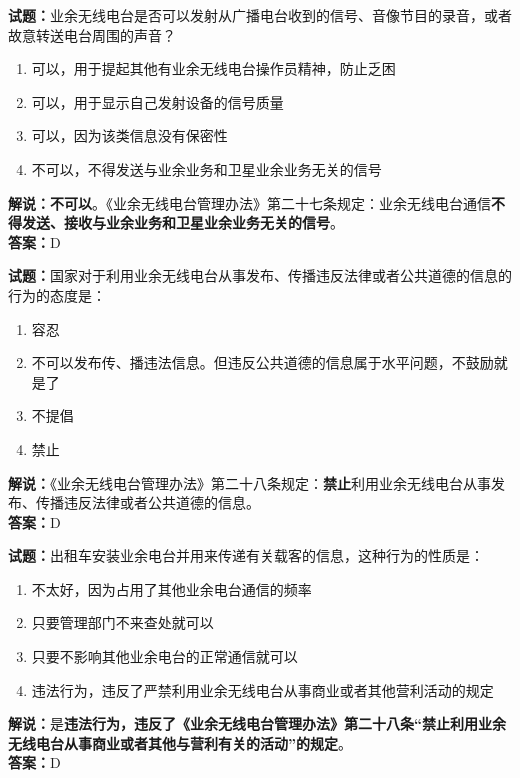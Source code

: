 \documentclass{ctexbook}
\begin{document}
\vspace{\baselineskip}

\noindent\textbf{试题：}业余无线电台是否可以发射从广播电台收到的信号、音像节目的录音，或者故意转送电台周围的声音？
\begin{enumerate}[leftmargin=3em]
  \item 可以，用于提起其他有业余无线电台操作员精神，防止乏困
  \item 可以，用于显示自己发射设备的信号质量
  \item 可以，因为该类信息没有保密性
  \item 不可以，不得发送与业余业务和卫星业余业务无关的信号
\end{enumerate}
\textbf{解说：不可以}。《业余无线电台管理办法》第二十七条规定：业余无线电台通信\textbf{不得发送、接收与业余业务和卫星业余业务无关的信号}。\\\noindent\textbf{答案：}D

\vspace{\baselineskip}

\noindent\textbf{试题：}国家对于利用业余无线电台从事发布、传播违反法律或者公共道德的信息的行为的态度是：
\begin{enumerate}[leftmargin=3em]
  \item 容忍
  \item 不可以发布传、播违法信息。但违反公共道德的信息属于水平问题，不鼓励就是了
  \item 不提倡
  \item 禁止
\end{enumerate}
\noindent\textbf{解说：}《业余无线电台管理办法》第二十八条规定：\textbf{禁止}利用业余无线电台从事发布、传播违反法律或者公共道德的信息。\\\noindent\textbf{答案：}D

\vspace{\baselineskip}

\noindent\textbf{试题：}出租车安装业余电台并用来传递有关载客的信息，这种行为的性质是：
\begin{enumerate}[leftmargin=3em]
  \item 不太好，因为占用了其他业余电台通信的频率
  \item 只要管理部门不来查处就可以
  \item 只要不影响其他业余电台的正常通信就可以
  \item 违法行为，违反了严禁利用业余无线电台从事商业或者其他营利活动的规定%
\end{enumerate}
\noindent\textbf{解说：}是\textbf{违法行为，违反了《业余无线电台管理办法》第二十八条“禁止利用业余无线电台从事商业或者其他与营利有关的活动”的规定}。\\\noindent\textbf{答案：}D
\end{document}
